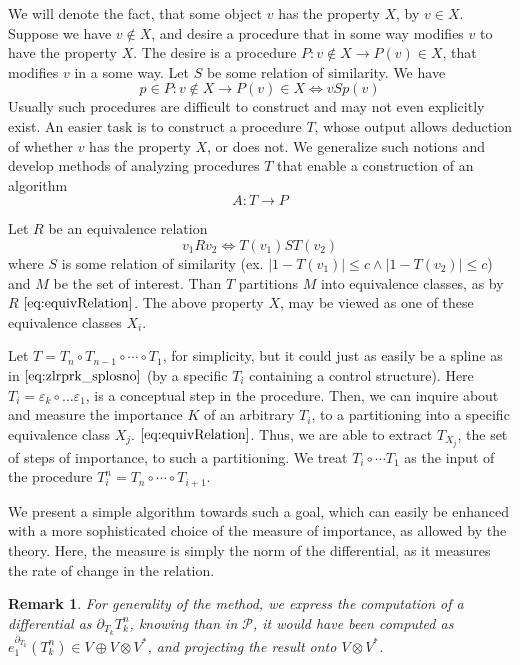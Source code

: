 \documentclass{article}
\newcommand{\dP}{\mathcal{P}}
\newcommand{\D}{\partial}
\newtheorem{opomba}{Remark}[section]
\begin{document}
  We will denote the fact, that some object $v$ has the property $X$, by $v\in X$. Suppose we have $v\notin X$, and desire a procedure that in some way modifies $v$ to have the property $X$. The desire is a procedure $P:v\notin X\to P(v)\in X$, that modifies $v$ in a some way. Let $S$ be some relation of similarity. We have
  \begin{equation}
  p\in P:v\notin X\to P(v)\in X\iff vSp(v)
  \end{equation}
  Usually such procedures are difficult to construct and may not even explicitly exist. An easier task is to construct a procedure $T$, whose output allows deduction of whether $v$ has the property $X$, or does not. We generalize such notions and develop methods of analyzing procedures $T$ that enable a construction of an algorithm
  \begin{equation}\label{eq:algA}
  A:T\to P
  \end{equation}
  
  Let $R$ be an equivalence relation 
  \begin{equation}\label{eq:equivRelation}
  v_1Rv_2\iff T(v_1)ST(v_2)
  \end{equation}
  where $S$ is some relation of similarity (ex. $\lvert1- T(v_1)\rvert\le c\land\lvert1- T(v_2)\rvert\le c$) and $M$ be the set of interest. Than $T$ partitions $M$ into equivalence classes, as by $R$ $\eqref{eq:equivRelation}$. The above property $X$, may be viewed as one of these equivalence classes $X_i$.
  
  Let $T=T_n\circ T_{n-1}\circ\cdots\circ T_1$, for simplicity, but it could just as easily be a spline as in $\eqref{eq:zlrprk_splosno}$ (by a specific $T_i$ containing a control structure). Here $T_i=\varepsilon_k\circ\ldots \varepsilon_1$, is a conceptual step in the procedure. Then, we can inquire about and measure the importance $K$ of an arbitrary $T_i$, to a partitioning into a specific equivalence class $X_j$. $\eqref{eq:equivRelation}$. Thus, we are able to extract $T_{X_j}$, the set of steps of importance, to such a partitioning. We treat $T_i\circ\cdots T_1$ as the input of the procedure $T^n_i=T_n\circ\cdots\circ T_{i+1}$.
  
  We present a simple algorithm towards such a goal, which can easily be enhanced with a more sophisticated choice of the measure of importance, as allowed by the theory. Here, the measure is simply the norm of the differential, as it measures the rate of change in the relation.
  
  \begin{opomba}
  For generality of the method, we express the computation of a differential as $\D_{T_k}T^n_k$, knowing than in $\dP$, it would have been computed as $e^{\D_{T_k}}_1(T^n_k)\in V\oplus V\otimes V^*$, and projecting the result onto $V\otimes V^*$.
  \end{opomba}
  
\end{document}
